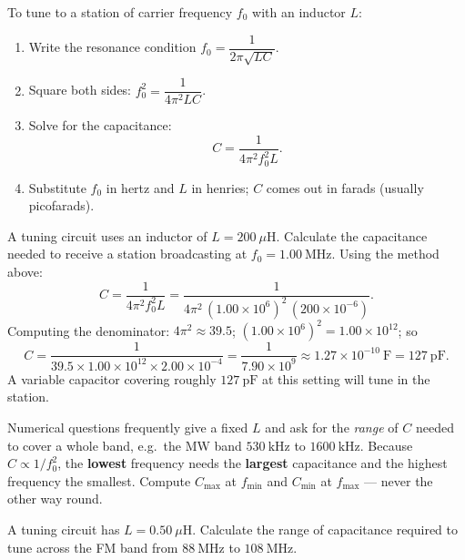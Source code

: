 \documentclass[11pt]{article}
\begin{document}
\begin{methode}
To tune to a station of carrier frequency $f_0$ with an inductor $L$:
\begin{enumerate}
  \item Write the resonance condition $f_0 = \dfrac{1}{2\pi\sqrt{LC}}$.
  \item Square both sides: $f_0^{2} = \dfrac{1}{4\pi^{2}LC}$.
  \item Solve for the capacitance:
  \[
  C = \frac{1}{4\pi^{2} f_0^{2} L}.
  \]
  \item Substitute $f_0$ in hertz and $L$ in henries; $C$ comes out in farads (usually picofarads).
\end{enumerate}
\end{methode}

\begin{exoresolu}
A tuning circuit uses an inductor of $L = 200\ \mu\mathrm{H}$. Calculate the capacitance needed to receive a station broadcasting at $f_0 = 1.00\ \mathrm{MHz}$.
\tcblower
Using the method above:
\[
C = \frac{1}{4\pi^{2} f_0^{2} L}
   = \frac{1}{4\pi^{2}\,(1.00\times 10^{6})^{2}\,(200\times 10^{-6})}.
\]
Computing the denominator: $4\pi^{2} \approx 39.5$; $(1.00\times10^{6})^{2} = 1.00\times10^{12}$; so
\[
C = \frac{1}{39.5 \times 1.00\times10^{12}\times 2.00\times10^{-4}}
  = \frac{1}{7.90\times10^{9}}
  \approx 1.27\times10^{-10}\ \mathrm{F} = 127\ \mathrm{pF}.
\]
A variable capacitor covering roughly $127\ \mathrm{pF}$ at this setting will tune in the station.
\end{exoresolu}

\begin{attention}
Numerical questions frequently give a fixed $L$ and ask for the \emph{range} of $C$ needed to cover a whole band, e.g.\ the MW band $530\ \mathrm{kHz}$ to $1600\ \mathrm{kHz}$. Because $C \propto 1/f_0^{2}$, the \textbf{lowest} frequency needs the \textbf{largest} capacitance and the highest frequency the smallest. Compute $C_{\max}$ at $f_{\min}$ and $C_{\min}$ at $f_{\max}$ — never the other way round.
\end{attention}

\begin{exercice}
A tuning circuit has $L = 0.50\ \mu\mathrm{H}$. Calculate the range of capacitance required to tune across the FM band from $88\ \mathrm{MHz}$ to $108\ \mathrm{MHz}$.
\end{exercice}
\end{document}
